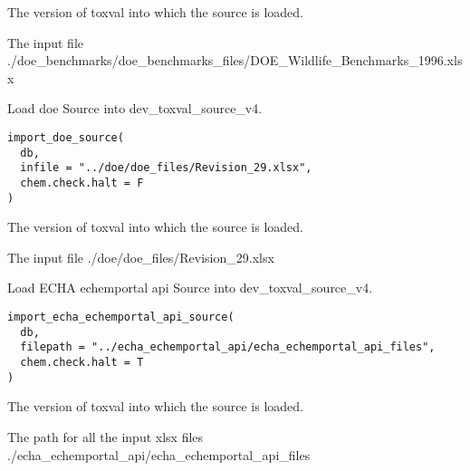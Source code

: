 \documentclass[letterpaper]{book}
\begin{document}
%
\begin{Arguments}
\begin{ldescription}
\item[\code{db}] The version of toxval into which the source is loaded.

\item[\code{infile}] The input file ./doe\_benchmarks/doe\_benchmarks\_files/DOE\_Wildlife\_Benchmarks\_1996.xlsx
\end{ldescription}
\end{Arguments}
%
\begin{Description}\relax
Load doe Source into dev\_toxval\_source\_v4.
\end{Description}
%
\begin{Usage}
\begin{verbatim}
import_doe_source(
  db,
  infile = "../doe/doe_files/Revision_29.xlsx",
  chem.check.halt = F
)
\end{verbatim}
\end{Usage}
%
\begin{Arguments}
\begin{ldescription}
\item[\code{db}] The version of toxval into which the source is loaded.

\item[\code{infile}] The input file ./doe/doe\_files/Revision\_29.xlsx
\end{ldescription}
\end{Arguments}
%
\begin{Description}\relax
Load ECHA echemportal api Source into dev\_toxval\_source\_v4.
\end{Description}
%
\begin{Usage}
\begin{verbatim}
import_echa_echemportal_api_source(
  db,
  filepath = "../echa_echemportal_api/echa_echemportal_api_files",
  chem.check.halt = T
)
\end{verbatim}
\end{Usage}
%
\begin{Arguments}
\begin{ldescription}
\item[\code{db}] The version of toxval into which the source is loaded.

\item[\code{filepath}] The path for all the input xlsx files ./echa\_echemportal\_api/echa\_echemportal\_api\_files
\end{ldescription}
\end{Arguments}
\end{document}
